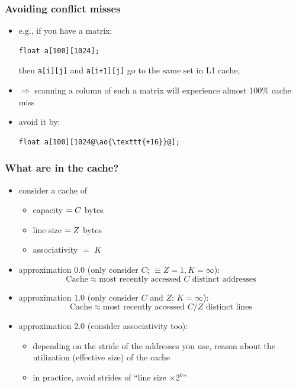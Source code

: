 \documentclass[12pt,dvipdfmx]{beamer}
\newcommand{\ao}[1]{{\color{blue}#1}}
\begin{document}
\begin{frame}[fragile]
\frametitle{Avoiding conflict misses}
\begin{itemize}
\item e.g., if you have a matrix:
\begin{lstlisting}
float a[100][1024];
\end{lstlisting}
then \texttt{a[i][j]} and \texttt{a[i+1][j]} go to the same set in L1 cache; 
\item $\Rightarrow$
scanning a column of such a matrix will experience 
almost 100\% cache miss
\item avoid it by:
\begin{lstlisting}
float a[100][1024@\ao{\texttt{+16}}@];
\end{lstlisting}
\end{itemize}
\end{frame}

\begin{frame}
\frametitle{What are in the cache?}

\begin{itemize}
\item<1-> consider a cache of
  \begin{itemize}
  \item capacity $= \ao{C}$ bytes
  \item line size $= \ao{Z}$ bytes
  \item associativity $=$ \ao{$K$}
  \end{itemize}
\item<2-> \ao{approximation 0.0 (only consider $C$; $\equiv Z = 1, K = \infty$):} 
\[ \mbox{Cache} \approx \mbox{most recently accessed $C$ distinct addresses} \]

\item<3-> \ao{approximation 1.0 (only consider $C$ and $Z$; $K = \infty$):} 
  \[ \mbox{Cache} \approx \mbox{most recently accessed $C/Z$ distinct lines} \]

\item<4-> \ao{approximation 2.0 (consider associativity too):}
  \begin{itemize}
  \item depending on the stride of the addresses you use,
    reason about the utilization (effective size) of the cache
  \item in practice, avoid strides of ``line size $\times 2^b$''
\end{itemize}
\end{itemize}
\end{frame}
\end{document}
